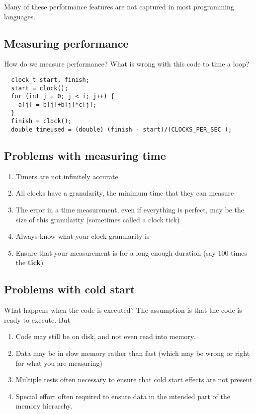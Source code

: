 \documentclass[%
oneside,                 %
final,                   %
10pt]{article}
\begin{document}
\noindent
Many of these  performance features are not captured in most programming languages.

\subsection*{Measuring performance}

How do we measure performance? What is wrong with this code to time a loop?








\begin{verbatim}
  clock_t start, finish;
  start = clock();
  for (int j = 0; j < i; j++) {
    a[j] = b[j]+b[j]*c[j];
  }
  finish = clock();
  double timeused = (double) (finish - start)/(CLOCKS_PER_SEC );

\end{verbatim}


\subsection*{Problems with measuring time}
\begin{enumerate}
\item Timers are not infinitely accurate

\item All clocks have a granularity, the minimum time that they can measure

\item The error in a time measurement, even if everything is perfect, may be the size of this granularity (sometimes called a clock tick)

\item Always know what your clock granularity is

\item Ensure that your measurement is for a long enough duration (say 100 times the \textbf{tick})
\end{enumerate}

\noindent
\subsection*{Problems with cold start}

What happens when the code is executed? The assumption is that the code is ready to
execute. But
\begin{enumerate}
\item Code may still be on disk, and not even read into memory.

\item Data may be in slow memory rather than fast (which may be wrong or right for what you are measuring)

\item Multiple tests often necessary to ensure that cold start effects are not present

\item Special effort often required to ensure data in the intended part of the memory hierarchy.
\end{enumerate}
\end{document}
